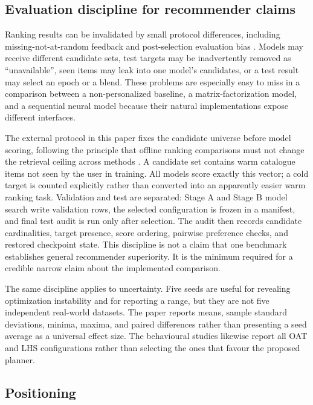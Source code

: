 \documentclass[pdflatex,sn-mathphys-num]{sn-jnl}
\theoremstyle{thmstyleone}
\theoremstyle{thmstyletwo}
\theoremstyle{thmstylethree}
\begin{document}
\subsection{Evaluation discipline for recommender claims}

Ranking results can be invalidated by small protocol differences, including missing-not-at-random feedback and post-selection evaluation bias \cite{yang2018unbiased,sun2020debiased,cawley2010selection}. Models may receive different candidate sets, test targets may be inadvertently removed as ``unavailable'', seen items may leak into one model's candidates, or a test result may select an epoch or a blend. These problems are especially easy to miss in a comparison between a non-personalized baseline, a matrix-factorization model, and a sequential neural model because their natural implementations expose different interfaces.

The external protocol in this paper fixes the candidate universe before model scoring, following the principle that offline ranking comparisons must not change the retrieval ceiling across methods \cite{cremonesi2010performance,harper2015movielens}. A candidate set contains warm catalogue items not seen by the user in training. All models score exactly this vector; a cold target is counted explicitly rather than converted into an apparently easier warm ranking task. Validation and test are separated: Stage A and Stage B model search write validation rows, the selected configuration is frozen in a manifest, and final test audit is run only after selection. The audit then records candidate cardinalities, target presence, score ordering, pairwise preference checks, and restored checkpoint state. This discipline is not a claim that one benchmark establishes general recommender superiority. It is the minimum required for a credible narrow claim about the implemented comparison.

The same discipline applies to uncertainty. Five seeds are useful for revealing optimization instability and for reporting a range, but they are not five independent real-world datasets. The paper reports means, sample standard deviations, minima, maxima, and paired differences rather than presenting a seed average as a universal effect size. The behavioural studies likewise report all OAT and LHS configurations rather than selecting the ones that favour the proposed planner.

\subsection{Positioning}
\end{document}
